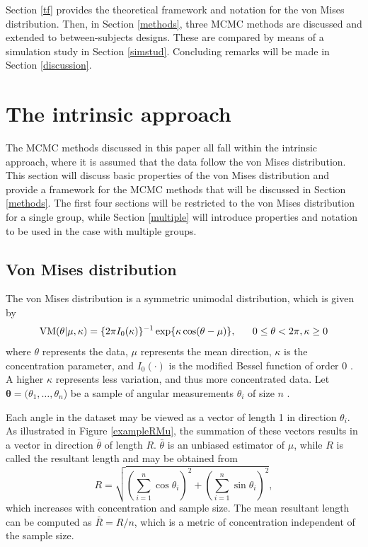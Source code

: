 \documentclass[]{gSCS2e}
\theoremstyle{plain}
\theoremstyle{definition}
\theoremstyle{remark}
\begin{document}
Section \ref{tf} provides the theoretical framework and notation for the von Mises distribution. Then, in Section \ref{methods}, three MCMC methods are discussed and extended to between-subjects designs. These are compared by means of a simulation study in Section \ref{simstud}. Concluding remarks will be made in Section \ref{discussion}.

\section{The intrinsic approach \label{tf}}

The MCMC methods discussed in this paper all fall within the intrinsic approach, where it is assumed that the data follow the von Mises distribution. This section will discuss basic properties of the von Mises distribution and provide a framework for the MCMC methods that will be discussed in Section \ref{methods}. The first four sections will be restricted to the von Mises distribution for a single group, while Section \ref{multiple} will introduce properties and notation to be used in the case with multiple groups. 

\subsection{Von Mises distribution}

The von Mises distribution is a symmetric unimodal distribution, which is given by
$$ \textnormal{VM}(\theta \vert \mu, \kappa) = \{2 \pi I_0(\kappa)\}^{-1} \exp\{\kappa \cos(\theta - \mu)\} , ~~~~~ 0\leq \theta < 2\pi, \kappa \geq 0$$
where $\theta$ represents the data, $\mu$ represents the mean direction, $\kappa$ is the concentration parameter, and $I_0(\cdot)$ is the modified Bessel function of order 0 \citep{abramowitz1972handbook}. A higher $\kappa$ represents less variation, and thus more concentrated data. Let $\boldsymbol\theta=(\theta_1, \dots, \theta_n$) be a sample of angular measurements $\theta_i$ of size $n$%
.

Each angle in the dataset may be viewed as a vector of length 1 in direction $\theta_i$. As illustrated in Figure \ref{exampleRMu}, the summation of these vectors results in a vector in direction $\bar{\theta}$ of length $R$. $\bar{\theta}$ is an unbiased estimator of $\mu$, while $R$ is called the resultant length and may be obtained from
$$ R = \sqrt{\left(\sum_{i=1}^{n} \cos \theta_i \right)^2 + \left(\sum_{i=1}^{n} \sin \theta_i \right)^2},$$
which increases with concentration and sample size. The mean resultant length can be computed as $\bar{R} = R/n$, which is a metric of concentration independent of the sample size. %
\end{document}
